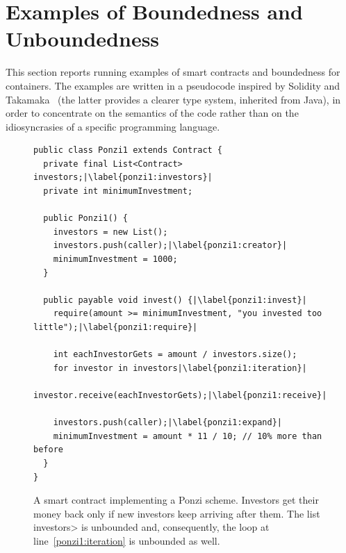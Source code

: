 \section{Examples of Boundedness and Unboundedness}\label{sec:examples}

This section reports running examples of smart contracts
and boundedness for containers. The examples are written in a pseudocode
inspired by Solidity and Takamaka~\cite{OlivieriST25}
(the latter provides a clearer type system, inherited from Java),
in order to concentrate on the semantics of the code rather than
on the idiosyncrasies of a specific programming language.

\begin{figure}[t]
  \begin{lstlisting}[language=pseudo]
public class Ponzi1 extends Contract {
  private final List<Contract> investors;|\label{ponzi1:investors}|
  private int minimumInvestment;

  public Ponzi1() {
    investors = new List();
    investors.push(caller);|\label{ponzi1:creator}|
    minimumInvestment = 1000;
  }

  public payable void invest() {|\label{ponzi1:invest}|
    require(amount >= minimumInvestment, "you invested too little");|\label{ponzi1:require}|

    int eachInvestorGets = amount / investors.size();
    for investor in investors|\label{ponzi1:iteration}|
      investor.receive(eachInvestorGets);|\label{ponzi1:receive}|

    investors.push(caller);|\label{ponzi1:expand}|
    minimumInvestment = amount * 11 / 10; // 10% more than before
  }
}
  \end{lstlisting}
  \caption{A smart contract implementing a Ponzi scheme. Investors get their money
    back only if new investors keep arriving after them. The list \<investors>
    is unbounded and, consequently, the loop at line~\ref{ponzi1:iteration} is unbounded as well.}
  \label{fig:ponzi1}
\end{figure}


